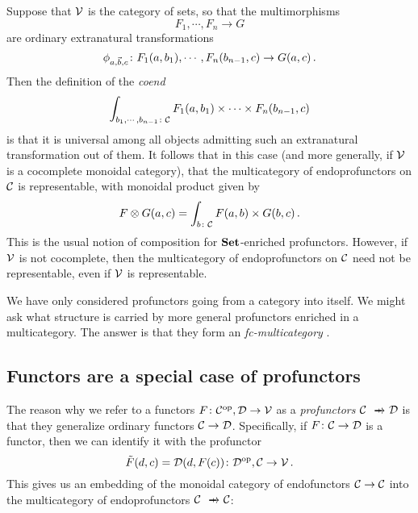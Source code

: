 \documentclass{article}
\begin{document}
Suppose that ${\mathcal{V}}$ is the category of sets, so that the multimorphisms
\[
  F_1,\cdots,F_n \to G
  \]
are ordinary extranatural transformations
\[
  \phi_{a,\vec{b},c} \colon F_1(a,b_1),\cdots,F_n(b_{n-1},c) \to G(a,c)\,.
  \]
Then the definition of the \emph{coend}
\[
  \int_{b_1,\cdots,b_{n-1}\colon{\mathcal{C}}} F_1(a,b_1)\times\cdots\times F_n(b_{n-1},c)
  \]
is that it is universal among all objects admitting such an extranatural transformation out of them.  
It follows that in this case (and more generally, if ${\mathcal{V}}$ is a cocomplete monoidal category), that the multicategory of endoprofunctors on ${\mathcal{C}}$ is representable, with monoidal product given by
\[
  F\otimes G(a, c) = \int_{b\colon {\mathcal{C}}} F(a,b) \times G(b,c)\,.
  \]
This is the usual notion of composition for ${\normalfont\textbf{Set}}$-enriched profunctors.  
However, if ${\mathcal{V}}$ is not cocomplete, then the multicategory of endoprofunctors on ${\mathcal{C}}$ need not be representable, even if ${\mathcal{V}}$ is representable.

We have only considered profunctors going from a category into itself.  
We might ask what structure is carried by more general profunctors enriched in a multicategory.
The answer is that they form an \emph{fc-multicategory} \cite{Multicategories}.  

\subsection{Functors are a special case of profunctors}

The reason why we refer to a functors $F\colon {\mathcal{C}}^{\mathrm{op}},{\mathcal{D}} \to {\mathcal{V}}$ as a \emph{profunctors} $\C \pto \D$ is that they generalize ordinary functors ${\mathcal{C}} \to {\mathcal{D}}$.  
Specifically, if $F \colon {\mathcal{C}} \to {\mathcal{D}}$ is a functor, then we can identify it with the profunctor
\[
  \tilde{F}(d,c) = {\mathcal{D}}(d, F(c)) \colon {\mathcal{D}}^{\mathrm{op}}, {\mathcal{C}} \to {\mathcal{V}}\,.
  \]
This gives us an embedding of the monoidal category of endofunctors ${\mathcal{C}} \to {\mathcal{C}}$ into the multicategory of endoprofunctors $\C \pto \C$:
\end{document}
